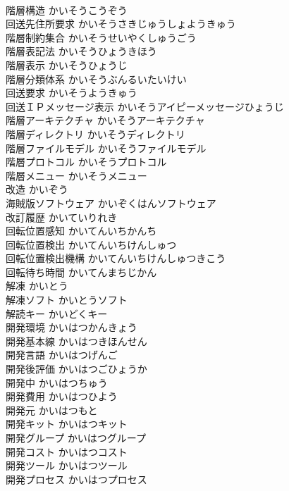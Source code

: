 \documentclass[8pt]{extreport}
\begin{document}
\begin{CJK}{UTF8}{min}
\\	階層構造	かいそうこうぞう	
\\	回送先住所要求	かいそうさきじゅうしょようきゅう	
\\	階層制約集合	かいそうせいやくしゅうごう	
\\	階層表記法	かいそうひょうきほう	
\\	階層表示	かいそうひょうじ	
\\	階層分類体系	かいそうぶんるいたいけい	
\\	回送要求	かいそうようきゅう	
\\	回送ＩＰメッセージ表示	かいそうアイピーメッセージひょうじ	
\\	階層アーキテクチャ	かいそうアーキテクチャ	
\\	階層ディレクトリ	かいそうディレクトリ	
\\	階層ファイルモデル	かいそうファイルモデル	
\\	階層プロトコル	かいそうプロトコル	
\\	階層メニュー	かいそうメニュー	
\\	改造	かいぞう	
\\	海賊版ソフトウェア	かいぞくはんソフトウェア	
\\	改訂履歴	かいていりれき	
\\	回転位置感知	かいてんいちかんち	
\\	回転位置検出	かいてんいちけんしゅつ	
\\	回転位置検出機構	かいてんいちけんしゅつきこう	
\\	回転待ち時間	かいてんまちじかん	
\\	解凍	かいとう	
\\	解凍ソフト	かいとうソフト	
\\	解読キー	かいどくキー	
\\	開発環境	かいはつかんきょう	
\\	開発基本線	かいはつきほんせん	
\\	開発言語	かいはつげんご	
\\	開発後評価	かいはつごひょうか	
\\	開発中	かいはつちゅう	
\\	開発費用	かいはつひよう	
\\	開発元	かいはつもと	
\\	開発キット	かいはつキット	
\\	開発グループ	かいはつグループ	
\\	開発コスト	かいはつコスト	
\\	開発ツール	かいはつツール	
\\	開発プロセス	かいはつプロセス	

\end{CJK}
\end{document}
